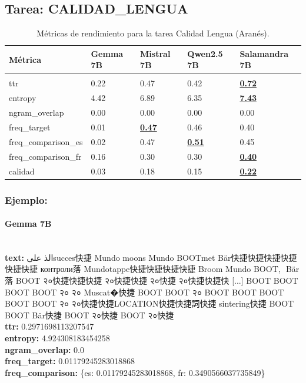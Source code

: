 \subsection{Tarea: CALIDAD\_LENGUA}\label{tarea-calidad_lengua}
\begin{longtable}[]{@{}lllll@{}}
\toprule\noalign{}
Métrica & Gemma 7B & Mistral 7B & Qwen2.5 7B & Salamandra 7B \\
\midrule\noalign{}
\endhead
\bottomrule\noalign{}
\caption{Métricas de rendimiento para la tarea Calidad Lengua (Aranés).}
\label{tab:metricas_calidad_lengua_Aranés}\\
\endlastfoot
ttr & 0.22 & 0.47 & 0.42 & \textbf{\underline{0.72}} \\
entropy & 4.42 & 6.89 & 6.35 & \textbf{\underline{7.43}} \\
ngram\_overlap & 0.00 & 0.00 & 0.00 & 0.00 \\
freq\_target & 0.01 & \textbf{\underline{0.47}} & 0.46 & 0.40 \\
freq\_comparison\_es & 0.02 & 0.47 & \textbf{\underline{0.51}} & 0.45 \\
freq\_comparison\_fr & 0.16 & 0.30 & 0.30 & \textbf{\underline{0.40}} \\
calidad & 0.03 & 0.18 & 0.15 & \textbf{\underline{0.22}} \\
\end{longtable}

\subsubsection{Ejemplo:}

\paragraph{Gemma 7B}~\\
\textbf{text:} الذ علىsucces快捷 Mundo moons Mundo BOOTmet Bär快捷快捷快捷快捷快捷快捷 контроли落 Mundotappe快捷快捷快捷快捷 Broom Mundo BOOT,\,\ Bär落 BOOT २०快捷快捷快捷 २०快捷快捷 २०快捷 २०快捷快捷快 [...] BOOT BOOT BOOT BOOT २० २० Muscat�快捷 BOOT BOOT २० BOOT BOOT BOOT BOOT BOOT २० २०快捷快捷LOCATION快捷快捷詞快捷 sintering快捷 BOOT BOOT Bär快捷 BOOT २०快捷 BOOT २०快捷\\
\textbf{ttr:} 0.2971698113207547\\
\textbf{entropy:} 4.924308183454258\\
\textbf{ngram\_overlap:} 0.0\\
\textbf{freq\_target:} 0.01179245283018868\\
\textbf{freq\_comparison:} \{\textquotesingle{}es\textquotesingle{}: 0.01179245283018868, \textquotesingle{}fr\textquotesingle{}: 0.3490566037735849\}

